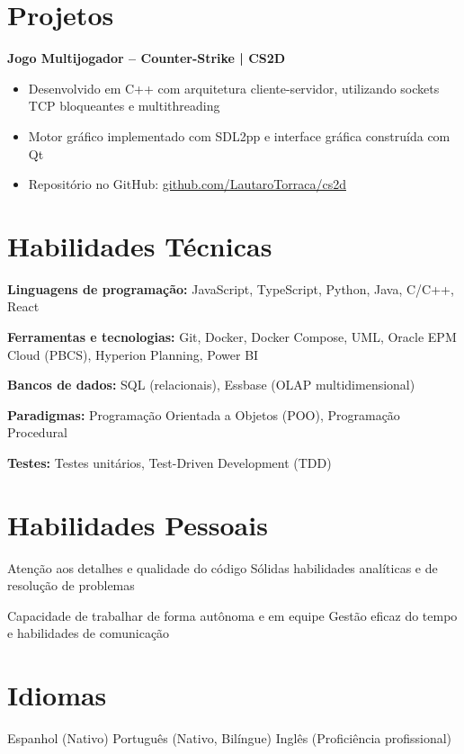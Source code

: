\documentclass[10pt,a4paper]{article}
\begin{document}
\section*{Projetos}

\textbf{Jogo Multijogador -- Counter-Strike | CS2D}
\begin{itemize}[leftmargin=*, noitemsep, topsep=3pt, itemsep=2pt]
  \item Desenvolvido em C++ com arquitetura cliente-servidor, utilizando
        sockets TCP bloqueantes e multithreading
  \item Motor gráfico implementado com SDL2pp e interface gráfica construída
        com Qt
  \item Repositório no GitHub:
        \href{https://github.com/LautaroTorraca/cs2d}{github.com/LautaroTorraca/cs2d}
\end{itemize}

\section*{Habilidades Técnicas}

\textbf{Linguagens de programação:} JavaScript, TypeScript, Python, Java, C/C++, React

\textbf{Ferramentas e tecnologias:} Git, Docker, Docker Compose, UML, Oracle EPM Cloud
(PBCS), Hyperion Planning, Power BI

\textbf{Bancos de dados:} SQL (relacionais), Essbase (OLAP multidimensional)

\textbf{Paradigmas:} Programação Orientada a Objetos (POO), Programação Procedural

\textbf{Testes:} Testes unitários, Test-Driven Development (TDD)

\section*{Habilidades Pessoais}

Atenção aos detalhes e qualidade do código
\quad\textperiodcentered\quad Sólidas habilidades analíticas e de resolução de problemas

Capacidade de trabalhar de forma autônoma e em equipe
\quad\textperiodcentered\quad Gestão eficaz do tempo e habilidades de comunicação

\section*{Idiomas}

Espanhol (Nativo)
\quad\textperiodcentered\quad Português (Nativo, Bilíngue)
\quad\textperiodcentered\quad Inglês (Proficiência profissional)
\end{document}
